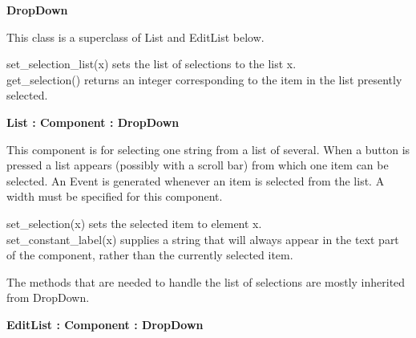 
{\sffamily\bfseries
{}DropDown}

This class is a superclass of List and EditList below.

set\_selection\_list(x) sets the list of selections to the list
x.\\
get\_selection() returns an integer corresponding to the item in the
list presently selected.

{\sffamily\bfseries
{}List : Component : DropDown}

This component is for selecting one string from a list of several. When
a button is pressed a list appears (possibly with a scroll bar) from
which one item can be selected. An Event is generated whenever an item
is selected from the list. A width must be specified for this
component.

set\_selection(x) sets the selected item to element x.\\
set\_constant\_label(x) supplies a string that will always appear in the
text part of the component, rather than the currently selected item.

The methods that are needed to handle the list of selections are mostly
inherited from DropDown. 


{\sffamily\bfseries
{}EditList : Component : DropDown}


